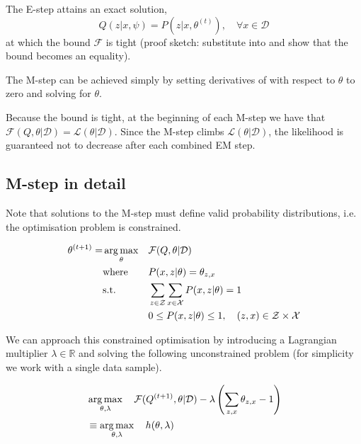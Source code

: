 The E-step attains an exact solution,
\begin{equation}\label{eq:E-solution}
	Q(z|x, \psi) = P(z|x, \theta^{(t)}), \quad{} \forall x \in \mathcal D
\end{equation}
\noindent at which the bound $\mathcal F$ is tight (proof sketch: substitute  into  and show that the bound becomes an equality).

The M-step can be achieved simply by setting derivatives of  with respect to $\theta$ to zero and solving for $\theta$.

Because the bound is tight, at the beginning of each M-step we have that $\mathcal F(Q, \theta | \mathcal D) = \mathcal L(\theta|\mathcal D)$. 
Since the M-step climbs $\mathcal L(\theta|\mathcal D)$, the likelihood is guaranteed not to decrease after each combined EM step.


\subsection{M-step in detail}


Note that solutions to the M-step must define valid probability distributions, i.e. the optimisation problem is constrained.

\begin{equation}
\begin{aligned}
	\theta^{(t+1)} =& \operatorname*{arg\,max}_\theta & & \mathcal F(Q, \theta | \mathcal D) \\
	&\text{where } & & P(x, z|\theta) = \theta_{z, x} \\
	&\text{s.t.} & & \sum_{z \in \mathcal Z} \sum_{x \in \mathcal X} P(x, z|\theta) = 1\\
	& & & 0 \leq P(x, z|\theta) \leq 1, \quad{} (z, x) \in \mathcal Z \times \mathcal X \\
\end{aligned}
\end{equation}



We can approach this constrained optimisation by introducing a Lagrangian multiplier $\lambda \in \mathbb R$ and solving the following unconstrained problem (for simplicity we work with a single data sample).

\begin{equation}
\begin{aligned}	
	& \operatorname*{arg\,max}_{\theta, \lambda}  \quad{} \mathcal F(Q^{(t+1)}, \theta|\mathcal D) - \lambda \left(\sum_{z,x} 
	\theta_{z, x} - 1\right)  \\
	&\equiv \operatorname*{arg\,max}_{\theta, \lambda} \quad{} h(\theta, \lambda)
\end{aligned}
\end{equation}

